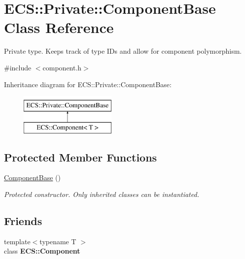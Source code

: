 \hypertarget{class_e_c_s_1_1_private_1_1_component_base}{\section{E\-C\-S\-:\-:Private\-:\-:Component\-Base Class Reference}
\label{class_e_c_s_1_1_private_1_1_component_base}
}


Private type. Keeps track of type I\-Ds and allow for component polymorphism.  




{\ttfamily \#include $<$component.\-h$>$}

Inheritance diagram for E\-C\-S\-:\-:Private\-:\-:Component\-Base\-:\begin{figure}[H]
\begin{center}
\leavevmode
\includegraphics[height=2.000000cm]{class_e_c_s_1_1_private_1_1_component_base}
\end{center}
\end{figure}
\subsection*{Protected Member Functions}
\begin{DoxyCompactItemize}
\item 
\hypertarget{class_e_c_s_1_1_private_1_1_component_base_a29d60cb01485127847456183e204b167}{\hyperlink{class_e_c_s_1_1_private_1_1_component_base_a29d60cb01485127847456183e204b167}{Component\-Base} ()}\label{class_e_c_s_1_1_private_1_1_component_base_a29d60cb01485127847456183e204b167}

\begin{DoxyCompactList}\small\item\em Protected constructor. Only inherited classes can be instantiated. \end{DoxyCompactList}\end{DoxyCompactItemize}
\subsection*{Friends}
\begin{DoxyCompactItemize}
\item 
\hypertarget{class_e_c_s_1_1_private_1_1_component_base_a8201bf3780452dd2c643fdd6bdf77155}{{\footnotesize template$<$typename T $>$ }\\class {\bfseries E\-C\-S\-::\-Component}}\label{class_e_c_s_1_1_private_1_1_component_base_a8201bf3780452dd2c643fdd6bdf77155}

\end{DoxyCompactItemize}


